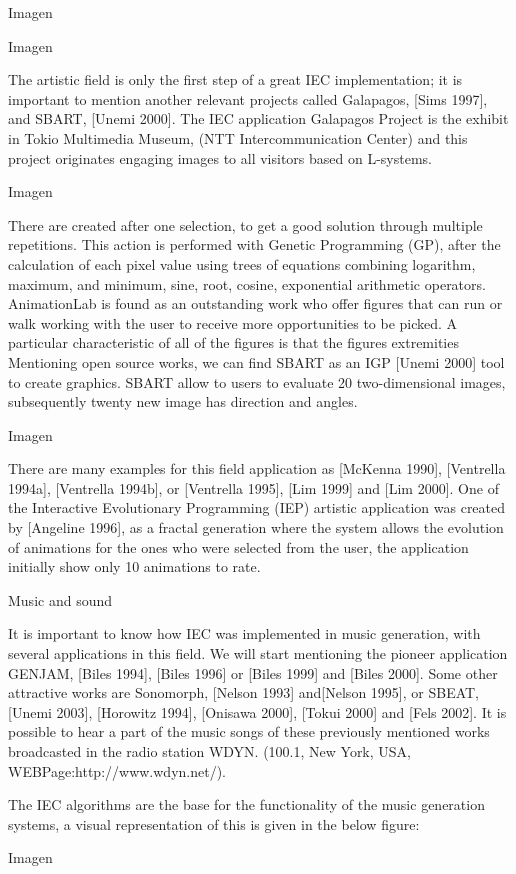 Imagen

Imagen

The artistic field is only the first step of a great IEC implementation; it is
important to mention another relevant projects called Galapagos, [Sims 1997],
and SBART, [Unemi 2000]. The IEC application Galapagos Project is the exhibit in
Tokio Multimedia Museum, (NTT Intercommunication Center) and this project
originates engaging images to all visitors based on L-systems.

Imagen

There are created after one selection, to get a good solution through multiple
repetitions. This action is performed with Genetic Programming (GP), after the
calculation of each pixel value using trees of equations combining logarithm,
maximum, and minimum, sine, root, cosine, exponential arithmetic operators.
AnimationLab is found as an outstanding work who offer figures that can run or
walk working with the user to receive more opportunities to be picked. A
particular characteristic of all of the figures is that the figures extremities
Mentioning open source works, we can find SBART as an IGP [Unemi 2000] tool to
create graphics. SBART allow to users to evaluate 20 two-dimensional images,
subsequently twenty new image has direction and angles.

Imagen

There are many examples for this field application as [McKenna 1990], [Ventrella
1994a], [Ventrella 1994b], or [Ventrella 1995], [Lim 1999] and [Lim 2000].  One
of the Interactive Evolutionary Programming (IEP)  artistic application was
created by [Angeline 1996], as a fractal generation where the system allows the
evolution of animations for the ones who were selected from the user, the
application initially show only 10 animations to rate.

Music and sound

It is important to know how IEC was implemented in music generation, with
several applications in this field. We will start mentioning the pioneer
application GENJAM, [Biles 1994], [Biles 1996] or [Biles 1999] and [Biles 2000].
Some other attractive works are Sonomorph, [Nelson 1993] and[Nelson 1995], or
SBEAT, [Unemi 2003], [Horowitz 1994], [Onisawa 2000], [Tokui 2000] and [Fels
2002]. It is possible to hear a part of the music songs of these previously
mentioned works broadcasted in the radio station WDYN. (100.1, New York, USA,
WEBPage:http://www.wdyn.net/).

The IEC algorithms are the base for the functionality of the music generation
systems, a visual representation of this is given in the below figure:

Imagen









